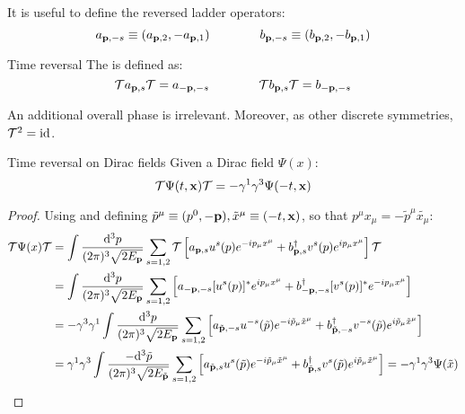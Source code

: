 It is useful to define the reversed ladder operators:
\begin{equation}
  a_{\mathbf{p},-s} \equiv (a_{\mathbf{p},2} , -a_{\mathbf{p},1})
  \qquad \qquad
  b_{\mathbf{p},-s} \equiv (b_{\mathbf{p},2} , -b_{\mathbf{p},1})
\end{equation}

\begin{definition}{Time reversal}{}
  The  is defined as:
  \begin{equation}
    \mathcal{T} a_{\mathbf{p},s} \mathcal{T} = a_{-\mathbf{p},-s}
    \qquad \qquad
    \mathcal{T} b_{\mathbf{p},s} \mathcal{T} = b_{-\mathbf{p},-s}
  \end{equation}
\end{definition}

An additional overall phase is irrelevant. Moreover, as other discrete symmetries, $ \mathcal{T}^2 = \operatorname{id} $.

\begin{proposition}{Time reversal on Dirac fields}{}
  Given a Dirac field $ \Psi(x) $:
  \begin{equation}
    \mathcal{T} \Psi(t,\mathbf{x}) \mathcal{T} = - \gamma^1 \gamma^3 \Psi(-t,\mathbf{x})
  \end{equation}
\end{proposition}

\begin{proofbox}
 \begin{proof}
   Using  and defining $ \tilde{p}^\mu \equiv (p^0,-\mathbf{p}) , \tilde{x}^\mu \equiv (-t,\mathbf{x}) $, so that $ p^\mu x_\mu = -\tilde{p}^\mu \tilde{x_\mu} $:
   \begin{equation*}
       \begin{split}
         \mathcal{T} \Psi(x) \mathcal{T}
         &= \int \frac{\mathrm{d}^3p}{(2\pi)^3 \sqrt{2E_{\mathbf{p}}}} \sum_{s = 1,2} \mathcal{T} \left[ a_{\mathbf{p},s} u^s(p) e^{-i p_\mu x^\mu} + b_{\mathbf{p},s}^\dagger v^s(p) e^{i p_\mu x^\mu} \right] \mathcal{T} \\
         &= \int \frac{\mathrm{d}^3p}{(2\pi)^3 \sqrt{2E_{\mathbf{p}}}} \sum_{s = 1,2} \left[ a_{-\mathbf{p},-s} [u^s(p)]^* e^{i p_\mu x^\mu} + b_{-\mathbf{p},-s}^\dagger [v^s(p)]^* e^{-i p_\mu x^\mu} \right] \\
         &= - \gamma^3 \gamma^1 \int \frac{\mathrm{d}^3p}{(2\pi)^3 \sqrt{2E_{\mathbf{p}}}} \sum_{s = 1,2} \left[ a_{\tilde{\mathbf{p}},-s} u^{-s}(\tilde{p}) e^{-i \tilde{p}_\mu \tilde{x}^\mu} + b_{\tilde{\mathbf{p}},-s}^\dagger v^{-s}(\tilde{p}) e^{i \tilde{p}_\mu \tilde{x}^\mu} \right] \\
         &= \gamma^1 \gamma^3 \int \frac{-\mathrm{d}^3\tilde{p}}{(2\pi)^3 \sqrt{2E_{\tilde{\mathbf{p}}}}} \sum_{s = 1,2} \left[ a_{\tilde{\mathbf{p}},s} u^s(\tilde{p}) e^{-i \tilde{p}_\mu \tilde{x}^\mu} + b_{\tilde{\mathbf{p}},s}^\dagger v^s(\tilde{p}) e^{i \tilde{p}_\mu \tilde{x}^\mu} \right]
        = - \gamma^1 \gamma^3 \Psi(\tilde{x})
      \end{split}
    \end{equation*}
  \end{proof}
\end{proofbox}

